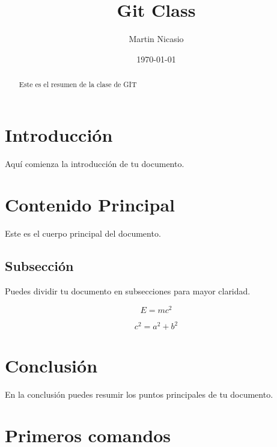 \documentclass[a4paper,12pt]{article}
\title{Git Class}
\author{Martin Nicasio}
\date{\today}
\begin{document}
\maketitle

\begin{abstract}
Este es el resumen de la clase de GIT
\end{abstract}

\section{Introducción}
Aquí comienza la introducción de tu documento.

\section{Contenido Principal}
Este es el cuerpo principal del documento.

\subsection{Subsección}
Puedes dividir tu documento en subsecciones para mayor claridad.

\begin{equation}
E = mc^2
\end{equation}

\begin{equation}
    c^2 = a^2 + b^2
\end{equation}

\section{Conclusión}
En la conclusión puedes resumir los puntos principales de tu documento.

\newpage
\section{Primeros comandos}
\end{document}
